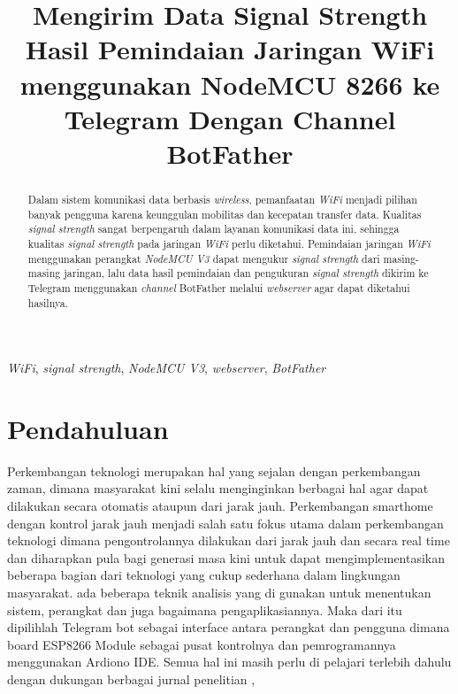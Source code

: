 \documentclass[conference]{IEEEtran}
\title{Mengirim Data Signal Strength Hasil Pemindaian Jaringan WiFi menggunakan NodeMCU 8266 ke Telegram Dengan Channel BotFather}
\author{Kevin Antony Kasamilale\IEEEauthorrefmark{1}\\
\textit{Fakultas Teknologi Informasi}\\
\textit{Teknik Komputer



}\\
\textit{Institut Teknologi Batam}\\
Batam, Indonesia\\
Email: \{\IEEEauthorrefmark{1}1922003@student.iteba.ac.id}
\begin{document}
\maketitle
\begin{abstract}
    Dalam sistem komunikasi data berbasis \emph{wireless}, pemanfaatan \emph{WiFi} 
    menjadi pilihan banyak pengguna karena keunggulan mobilitas dan kecepatan transfer data.
    Kualitas \emph{signal strength} sangat berpengaruh dalam layanan komunikasi data ini, 
    sehingga kualitas \emph{signal strength} pada jaringan \emph{WiFi} perlu diketahui.
    Pemindaian jaringan \emph{WiFi} menggunakan perangkat \emph{NodeMCU V3} dapat mengukur \emph{signal strength} dari 
    masing-masing jaringan, lalu data hasil pemindaian dan pengukuran \emph{signal strength} dikirim ke
    Telegram menggunakan \emph{channel} BotFather melalui \emph{webserver} agar dapat diketahui hasilnya.
\end{abstract}
\vspace{0.2cm}
\begin{IEEEkeywords}
    \emph{WiFi}, \emph{signal strength}, \emph{NodeMCU V3}, \emph{webserver}, \emph{BotFather}
\end{IEEEkeywords}
\section{Pendahuluan}
Perkembangan teknologi merupakan hal yang sejalan dengan 
perkembangan zaman, dimana masyarakat kini selalu
menginginkan berbagai hal agar dapat dilakukan secara otomatis
ataupun dari jarak jauh. Perkembangan smarthome dengan
kontrol jarak jauh menjadi salah satu fokus utama dalam
perkembangan teknologi dimana pengontrolannya dilakukan dari
jarak jauh dan secara real time dan diharapkan pula bagi generasi
masa kini untuk dapat mengimplementasikan beberapa bagian
dari teknologi yang cukup sederhana dalam lingkungan masyarakat. ada
beberapa teknik analisis yang di gunakan untuk menentukan
sistem, perangkat dan juga bagaimana pengaplikasiannya. Maka
dari itu dipilihlah Telegram bot sebagai interface antara perangkat
dan pengguna dimana board ESP8266 Module sebagai pusat
kontrolnya dan pemrogramannya menggunakan Ardiono IDE.
Semua hal ini masih perlu di pelajari terlebih dahulu dengan
dukungan berbagai jurnal penelitian ,
    
\end{document}
